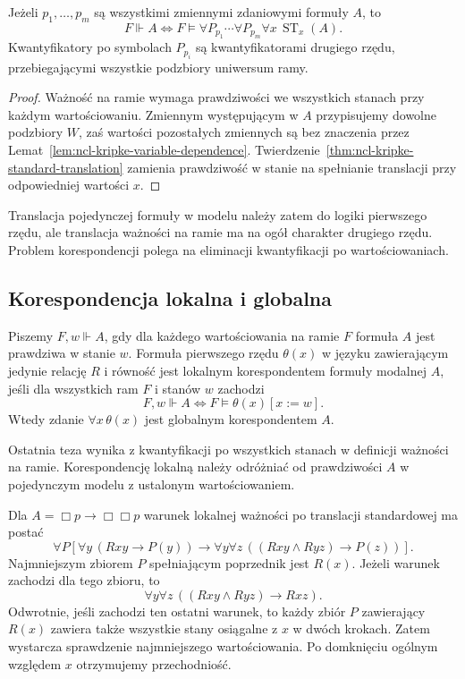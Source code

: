 \begin{wniosek}
\label{cor:ncl-kripke-second-order-translation}
Jeżeli $p_1,\ldots,p_m$ są wszystkimi zmiennymi
zdaniowymi formuły $A$, to
\[
 F\Vdash A\iff
 F\models\forall P_{p_1}\cdots\forall P_{p_m}
                \forall x\,\operatorname{ST}_x(A).
\]
Kwantyfikatory po symbolach $P_{p_i}$ są
kwantyfikatorami drugiego rzędu, przebiegającymi
wszystkie podzbiory uniwersum ramy.
\end{wniosek}
\begin{proof}
Ważność na ramie wymaga prawdziwości we
wszystkich stanach przy każdym wartościowaniu.
Zmiennym występującym w $A$ przypisujemy
dowolne podzbiory $W$, zaś wartości pozostałych
zmiennych są bez znaczenia przez
Lemat~\ref{lem:ncl-kripke-variable-dependence}.
Twierdzenie~\ref{thm:ncl-kripke-standard-translation}
zamienia prawdziwość w stanie na spełnianie
translacji przy odpowiedniej wartości $x$.
\end{proof}

Translacja pojedynczej formuły w modelu
należy zatem do logiki pierwszego rzędu,
ale translacja ważności na ramie ma na ogół
charakter drugiego rzędu. Problem
korespondencji polega na eliminacji
kwantyfikacji po wartościowaniach.

\subsection{Korespondencja lokalna i globalna}

\begin{definicja}
\label{def:ncl-kripke-first-order-correspondent}
Piszemy $F,w\Vdash A$, gdy dla każdego
wartościowania na ramie $F$ formuła $A$
jest prawdziwa w stanie $w$.
Formuła pierwszego rzędu $\theta(x)$
w języku zawierającym jedynie relację $R$
i równość jest lokalnym korespondentem
formuły modalnej $A$, jeśli dla wszystkich
ram $F$ i stanów $w$ zachodzi
\[
 F,w\Vdash A\iff F\models\theta(x)[x:=w].
\]
Wtedy zdanie $\forall x\,\theta(x)$ jest
globalnym korespondentem $A$.
\end{definicja}
Ostatnia teza wynika z kwantyfikacji po
wszystkich stanach w definicji ważności
na ramie. Korespondencję lokalną należy
odróżniać od prawdziwości $A$ w pojedynczym
modelu z ustalonym wartościowaniem.

\begin{przyklad}
\label{ex:ncl-kripke-correspondence-four}
Dla $A=\Box p\to\Box\Box p$ warunek
lokalnej ważności po translacji standardowej
ma postać
\[
 \forall P\left[
  \forall y\,(Rxy\to P(y))\to
  \forall y\forall z\,((Rxy\wedge Ryz)\to P(z))
 \right].
\]
Najmniejszym zbiorem $P$ spełniającym
poprzednik jest $R(x)$. Jeżeli warunek
zachodzi dla tego zbioru, to
\[
 \forall y\forall z\,((Rxy\wedge Ryz)\to Rxz).
\]
Odwrotnie, jeśli zachodzi ten ostatni warunek,
to każdy zbiór $P$ zawierający $R(x)$
zawiera także wszystkie stany osiągalne
z $x$ w dwóch krokach. Zatem wystarcza
sprawdzenie najmniejszego wartościowania.
Po domknięciu ogólnym względem $x$
otrzymujemy przechodniość.
\end{przyklad}

